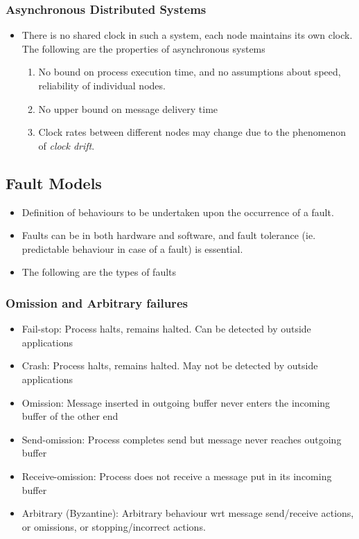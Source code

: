 \documentclass{article}
\begin{document}
\subsubsection{Asynchronous Distributed Systems}
\begin{itemize}
    \item There is no shared clock in such a system, each node maintains its own clock. The following are the properties of asynchronous systems
    \begin{enumerate}
        \item No bound on process execution time, and no assumptions about speed, reliability of individual nodes. 
        
        \item No upper bound on message delivery time
        
        \item Clock rates between different nodes may change due to the phenomenon of \textit{clock drift}. 
    \end{enumerate}
\end{itemize}

\subsection{Fault Models}
\begin{itemize}
    \item Definition of behaviours to be undertaken upon the occurrence of a fault. 
    
    \item Faults can be in both hardware and software, and fault tolerance (ie. predictable behaviour in case of a fault) is essential. 
    
    \item The following are the types of faults
\end{itemize}
\subsubsection{Omission and Arbitrary failures}
\begin{itemize}
    \item Fail-stop: Process halts, remains halted. Can be detected by outside applications
    
    \item Crash:  Process halts, remains halted. May not be detected by outside applications
    
    \item Omission: Message inserted in outgoing buffer never enters the incoming buffer of the other end
    
    \item Send-omission: Process completes send but message never reaches outgoing buffer
    
    \item Receive-omission: Process does not receive a message put in its incoming buffer
    
    \item Arbitrary (Byzantine): Arbitrary behaviour wrt message send/receive actions, or omissions, or stopping/incorrect actions. 
\end{itemize}
\end{document}
